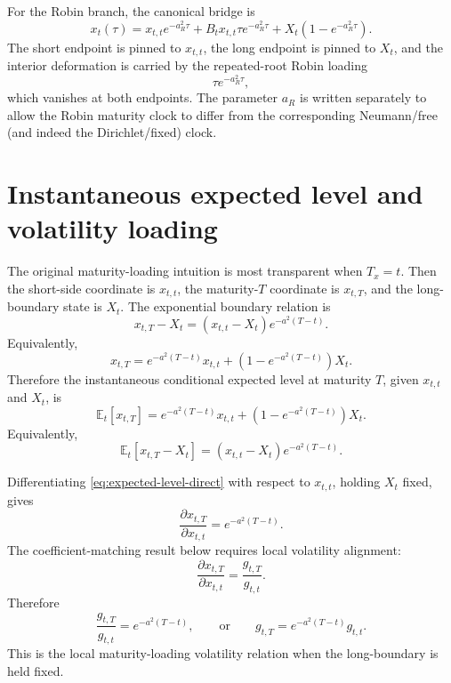 \documentclass[11pt]{article}
\numberwithin{equation}{section}
\begin{document}
For the Robin branch, the canonical bridge is
\begin{equation}
\label{eq:canonical-bridge}
x_t(\tau)
=
x_{t,t}e^{-a_R^2\tau}
+
B_tx_{t,t}\tau e^{-a_R^2\tau}
+
X_t\left(1-e^{-a_R^2\tau}\right).
\end{equation}
The short endpoint is pinned to \(x_{t,t}\), the long endpoint is pinned to \(X_t\), and the interior deformation is carried by the repeated-root Robin loading
\[
\tau e^{-a_R^2\tau},
\]
which vanishes at both endpoints. The parameter \(a_R\) is written separately to allow the Robin maturity clock to differ from the corresponding Neumann/free (and indeed the Dirichlet/fixed) clock.

\section{Instantaneous expected level and volatility loading}

The original maturity-loading intuition is most transparent when \(T_x=t\). Then the short-side coordinate is \(x_{t,t}\), the maturity-\(T\) coordinate is \(x_{t,T}\), and the long-boundary state is \(X_t\). The exponential boundary relation is
\begin{equation}
\label{eq:expected-level-boundary-relation}
x_{t,T}-X_t
=
\left(x_{t,t}-X_t\right)e^{-a^2(T-t)}.
\end{equation}
Equivalently,
\begin{equation}
\label{eq:expected-level-direct}
x_{t,T}
=
e^{-a^2(T-t)}x_{t,t}
+
\left(1-e^{-a^2(T-t)}\right)X_t.
\end{equation}
Therefore the instantaneous conditional expected level at maturity \(T\), given \(x_{t,t}\) and \(X_t\), is
\begin{equation}
\label{eq:instantaneous-expected-level}
\mathbb E_t[x_{t,T}]
=
e^{-a^2(T-t)}x_{t,t}
+
\left(1-e^{-a^2(T-t)}\right)X_t.
\end{equation}
Equivalently,
\[
\mathbb E_t[x_{t,T}-X_t]
=
\left(x_{t,t}-X_t\right)e^{-a^2(T-t)}.
\]

Differentiating \eqref{eq:expected-level-direct} with respect to \(x_{t,t}\), holding \(X_t\) fixed, gives
\begin{equation}
\label{eq:local-maturity-loading-derivative}
\frac{\partial x_{t,T}}{\partial x_{t,t}}
=
e^{-a^2(T-t)}.
\end{equation}
The coefficient-matching result below requires local volatility alignment:
\[
\frac{\partial x_{t,T}}{\partial x_{t,t}}
=
\frac{g_{t,T}}{g_{t,t}}.
\]
Therefore
\begin{equation}
\label{eq:maturity-vol-alignment}
\frac{g_{t,T}}{g_{t,t}}
=
e^{-a^2(T-t)},
\qquad
\text{or}
\qquad
g_{t,T}=e^{-a^2(T-t)}g_{t,t}.
\end{equation}
This is the local maturity-loading volatility relation when the long-boundary is held fixed.
\end{document}
